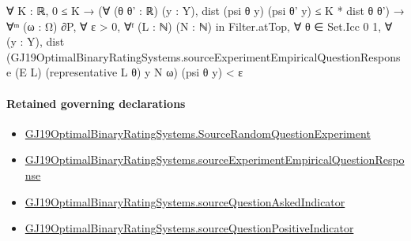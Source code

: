 \documentclass[10pt]{article}
\begin{document}
\begin{ReviewVerbatim}
                      ∀ {K : ℝ},
                        0 ≤ K →
                          (∀ (θ θ' : ℝ) (y : Y), dist (psi θ y) (psi θ' y) ≤ K * dist θ θ') →
                            ∀ᵐ (ω : Ω) ∂P,
                              ∀ ε > 0,
                                ∀ᶠ (L : ℕ) (N : ℕ) in Filter.atTop,
                                  ∀ θ ∈ Set.Icc 0 1,
                                    ∀ (y : Y),
                                      dist
                                          (GJ19OptimalBinaryRatingSystems.sourceExperimentEmpiricalQuestionResponse
                                            (E L) (representative L θ) y N ω)
                                          (psi θ y) <
                                        ε
\end{ReviewVerbatim}

\paragraph{Retained governing declarations}
\begin{itemize}\raggedright
\item \hyperlink{paper-prerequisite-7a235f61a510cc28}{GJ19\allowbreak{}Optimal\allowbreak{}Binary\allowbreak{}Rating\allowbreak{}Systems.\allowbreak{}Source\allowbreak{}Random\allowbreak{}Question\allowbreak{}Experiment}
\item \hyperlink{paper-prerequisite-bb12d1c548870615}{GJ19\allowbreak{}Optimal\allowbreak{}Binary\allowbreak{}Rating\allowbreak{}Systems.\allowbreak{}source\allowbreak{}Experiment\allowbreak{}Empirical\allowbreak{}Question\allowbreak{}Response}
\item \hyperlink{governing-declaration-756fc6d8eb1da5bb}{GJ19\allowbreak{}Optimal\allowbreak{}Binary\allowbreak{}Rating\allowbreak{}Systems.\allowbreak{}source\allowbreak{}Question\allowbreak{}Asked\allowbreak{}Indicator}
\item \hyperlink{governing-declaration-ec4f87fcd48c433f}{GJ19\allowbreak{}Optimal\allowbreak{}Binary\allowbreak{}Rating\allowbreak{}Systems.\allowbreak{}source\allowbreak{}Question\allowbreak{}Positive\allowbreak{}Indicator}
\end{itemize}
\end{document}
